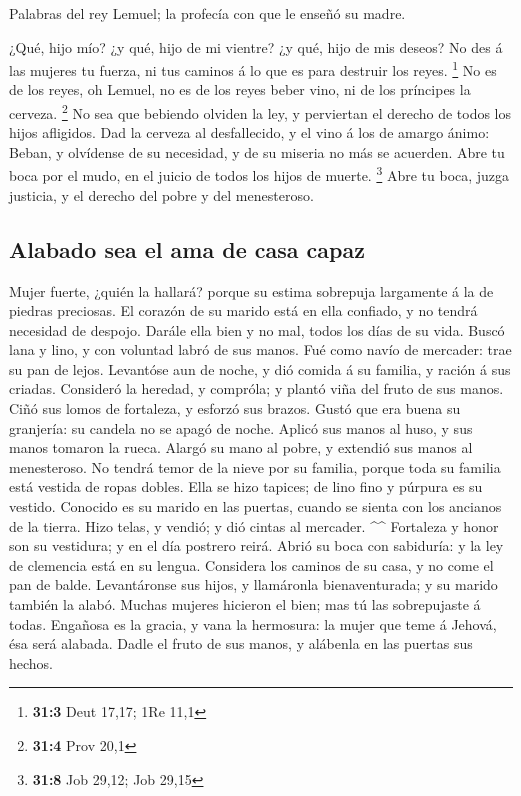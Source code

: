  Palabras del rey Lemuel; la profecía con que le enseñó su
madre.

 ¿Qué, hijo mío? ¿y qué, hijo de mi vientre? ¿y qué, hijo
de mis deseos?  No des á las mujeres tu fuerza, ni tus
caminos á lo que es para destruir los reyes. \footnote{\textbf{31:3}
  Deut 17,17; 1Re 11,1}  No es de los reyes, oh Lemuel, no
es de los reyes beber vino, ni de los príncipes la cerveza. \footnote{\textbf{31:4}
  Prov 20,1}  No sea que bebiendo olviden la ley, y
perviertan el derecho de todos los hijos afligidos.  Dad
la cerveza al desfallecido, y el vino á los de amargo ánimo:
 Beban, y olvídense de su necesidad, y de su miseria no
más se acuerden.  Abre tu boca por el mudo, en el juicio
de todos los hijos de muerte. \footnote{\textbf{31:8} Job 29,12; Job
  29,15}  Abre tu boca, juzga justicia, y el derecho del
pobre y del menesteroso.

\hypertarget{alabado-sea-el-ama-de-casa-capaz}{%
\subsection{Alabado sea el ama de casa
capaz}\label{alabado-sea-el-ama-de-casa-capaz}}

 Mujer fuerte, ¿quién la hallará? porque su estima
sobrepuja largamente á la de piedras preciosas.  El
corazón de su marido está en ella confiado, y no tendrá necesidad de
despojo.  Darále ella bien y no mal, todos los días de su
vida.  Buscó lana y lino, y con voluntad labró de sus
manos.  Fué como navío de mercader: trae su pan de lejos.
 Levantóse aun de noche, y dió comida á su familia, y
ración á sus criadas.  Consideró la heredad, y compróla;
y plantó viña del fruto de sus manos.  Ciñó sus lomos de
fortaleza, y esforzó sus brazos.  Gustó que era buena su
granjería: su candela no se apagó de noche.  Aplicó sus
manos al huso, y sus manos tomaron la rueca.  Alargó su
mano al pobre, y extendió sus manos al menesteroso.  No
tendrá temor de la nieve por su familia, porque toda su familia está
vestida de ropas dobles.  Ella se hizo tapices; de lino
fino y púrpura es su vestido.  Conocido es su marido en
las puertas, cuando se sienta con los ancianos de la tierra.
 Hizo telas, y vendió; y dió cintas al mercader. \^{}\^{}
 Fortaleza y honor son su vestidura; y en el día postrero
reirá.  Abrió su boca con sabiduría: y la ley de
clemencia está en su lengua.  Considera los caminos de su
casa, y no come el pan de balde.  Levantáronse sus hijos,
y llamáronla bienaventurada; y su marido también la alabó.
 Muchas mujeres hicieron el bien; mas tú las sobrepujaste
á todas.  Engañosa es la gracia, y vana la hermosura: la
mujer que teme á Jehová, ésa será alabada.  Dadle el
fruto de sus manos, y alábenla en las puertas sus hechos.
